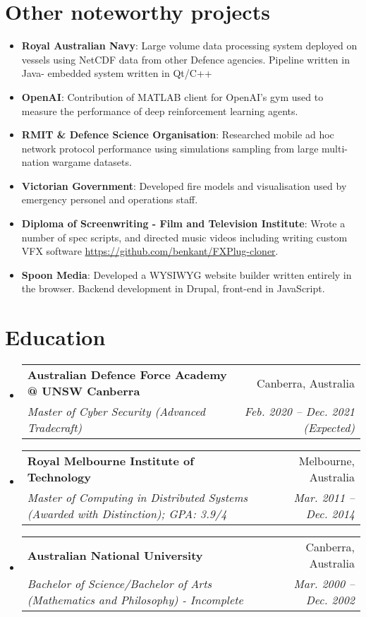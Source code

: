 \documentclass[11pt]{article}
\makeatletter
\newcommand{\resumeItem}[2]{
  \item\small{
    \textbf{#1}{: #2 \vspace{-2pt}}
  }
}
\newcommand{\resumeSubheading}[4]{
  \vspace{-1pt}\item
    \begin{tabular*}{0.97\textwidth}[t]{l@{\extracolsep{\fill}}r}
      \textbf{#1} & #2 \\
      \textit{\small#3} & \textit{\small #4} \\
    \end{tabular*}\vspace{-5pt}
}
\newcommand{\resumeSubItem}[2]{\resumeItem{#1}{#2}\vspace{-4pt}}
\newcommand{\resumeSubHeadingListStart}{\begin{itemize}[leftmargin=*]}
\newcommand{\resumeSubHeadingListEnd}{\end{itemize}}
\makeatother
\begin{document}
\section{Other noteworthy projects}
  \resumeSubHeadingListStart
    \resumeSubItem{Royal Australian Navy}
      {Large volume data processing system deployed on vessels using NetCDF data from other Defence agencies. Pipeline written in Java- embedded system written in Qt/C++}
    \resumeSubItem{OpenAI}
      {Contribution of MATLAB client for OpenAI's gym used to measure the performance of deep reinforcement learning agents.}
    \resumeSubItem{RMIT \& Defence Science Organisation}
      {Researched mobile ad hoc network protocol performance using simulations sampling from large multi-nation wargame datasets.}
    \resumeSubItem{Victorian Government}
      {Developed fire models and visualisation used by emergency personel and operations staff.}
    \resumeSubItem{Diploma of Screenwriting - Film and Television Institute}
      {Wrote a number of spec scripts, and directed music videos including writing custom VFX software \href{https://github.com/benkant/FXPlug-cloner}{https://github.com/benkant/FXPlug-cloner}.}
    \resumeSubItem{Spoon Media}
      {Developed a WYSIWYG website builder written entirely in the browser. Backend development in Drupal, front-end in JavaScript.}
  \resumeSubHeadingListEnd

\section{Education}
  \resumeSubHeadingListStart
    \resumeSubheading
      {Australian Defence Force Academy @ UNSW Canberra}{Canberra, Australia}
      {Master of Cyber Security (Advanced Tradecraft)}{Feb. 2020 -- Dec. 2021 (Expected)}
    \resumeSubheading
      {Royal Melbourne Institute of Technology}{Melbourne, Australia}
      {Master of Computing in Distributed Systems (Awarded with Distinction);  GPA: 3.9/4}{Mar. 2011 -- Dec. 2014}
    \resumeSubheading
      {Australian National University}{Canberra, Australia}
      {Bachelor of Science/Bachelor of Arts (Mathematics and Philosophy) - Incomplete}{Mar. 2000 -- Dec. 2002}
  \resumeSubHeadingListEnd

\end{document}
